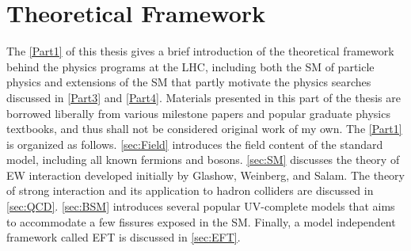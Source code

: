 \part{Theoretical Framework}
\label{Part1}
The \autoref{Part1} of this thesis gives a brief introduction of the theoretical framework behind the physics programs at the \ac{LHC}, including both the \ac{SM} of particle physics and extensions of the \ac{SM} that partly motivate the physics searches discussed in \autoref{Part3} and \autoref{Part4}. Materials presented in this part of the thesis are borrowed liberally from various milestone papers and popular graduate physics textbooks, and thus shall not be considered original work of my own. The \autoref{Part1} is organized as follows. \autoref{sec:Field} introduces the field content of the standard model, including all known fermions and bosons. \autoref{sec:SM} discusses the theory of \ac{EW} interaction developed initially by Glashow, Weinberg, and Salam. The theory of strong interaction and its application to hadron colliders are discussed in \autoref{sec:QCD}. \autoref{sec:BSM} introduces several popular \ac{UV}-complete models that aims to accommodate a few fissures exposed in the \ac{SM}. Finally, a model independent framework called \ac{EFT} is discussed in \autoref{sec:EFT}.






